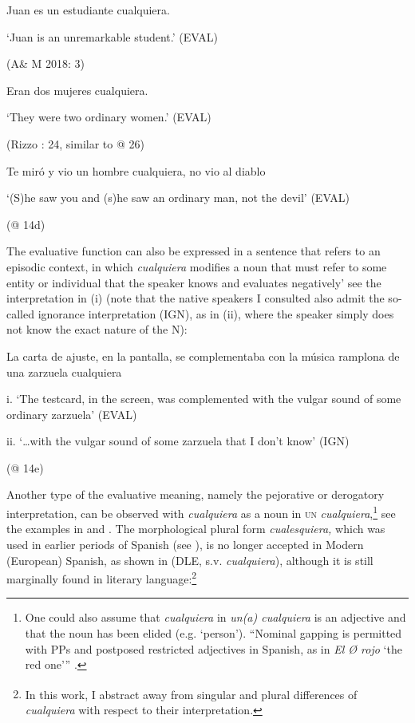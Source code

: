 \documentclass[output=paper]{langscibook}
\begin{document}
\label{bkm:Ref533761081}  Juan es un estudiante cualquiera. 

‘Juan is an unremarkable student.’ (EVAL)

  (A\& M 2018: 3)

  Eran dos mujeres cualquiera. 

  ‘They were two ordinary women.’ (EVAL)

  (Rizzo \citealt{Salierno2013}: 24, similar to @ 26)

\label{bkm:Ref533953228}  Te miró y vio un hombre cualquiera, no vio al diablo 

  ‘(S)he saw you and (s)he saw an ordinary man, not the devil’ (EVAL)

  (@ 14d)

The evaluative function can also be expressed in a sentence that refers to an episodic context, in which \textit{cualquiera} modifies a noun that must refer to some entity or individual that the speaker knows and evaluates negatively’ see the interpretation in (i) (note that the native speakers I consulted also admit the so-called ignorance interpretation (IGN), as in (ii), where the speaker simply does not know the exact nature of the N):

\label{bkm:Ref54686931}  La carta de ajuste, en la pantalla, se complementaba con la música ramplona de una zarzuela cualquiera 

  i.   ‘The testcard, in the screen, was complemented with the vulgar sound of some ordinary zarzuela’   (EVAL)

  ii.  ‘…with the vulgar sound of some zarzuela that I don’t know’ (IGN)

  (@ 14e)

Another type of the evaluative meaning, namely the pejorative or derogatory interpretation, can be observed with \textit{cualquiera} as a noun in \textsc{un} \textit{cualquiera},\footnote{ \textrm{One could also assume that} \textrm{\textit{cualquiera}} \textrm{in} \textrm{\textit{un(a) cualquiera}} \textrm{is an adjective and that the noun has been elided (e.g. ‘person’). “Nominal gapping is permitted with PPs and postposed restricted adjectives in Spanish, as in} \textrm{\textit{El Ø rojo}} \textrm{‘the red one’” \citep[34]{Bosque2001}.}} see the examples in  and . The morphological plural form \textit{cualesquiera,} which was used in earlier periods of Spanish (see ), is no longer accepted in Modern (European) Spanish, as shown in  (DLE, s.v. \textit{cualquiera}), although it is still marginally found in literary language:\footnote{\textrm{\textsuperscript{} }\textrm{In this work, I abstract away from singular and plural differences of} \textrm{\textit{cualquiera}} \textrm{with respect to their interpretation.} }
\end{document}
